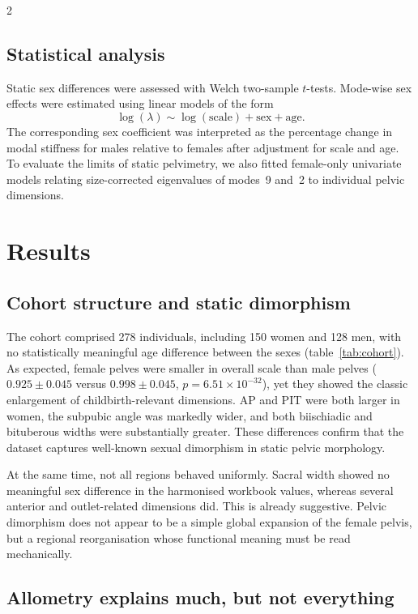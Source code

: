 \documentclass[openacc]{rsproca_new}
\begin{document}
\begin{multicols}{2}
\subsection{Statistical analysis}

Static sex differences were assessed with Welch two-sample $t$-tests. Mode-wise sex effects were estimated using linear models of the form
\begin{equation}
\log(\lambda) \sim \log(\mathrm{scale}) + \mathrm{sex} + \mathrm{age}.
\end{equation}
The corresponding sex coefficient was interpreted as the percentage change in modal stiffness for males relative to females after adjustment for scale and age. To evaluate the limits of static pelvimetry, we also fitted female-only univariate models relating size-corrected eigenvalues of modes~9 and~2 to individual pelvic dimensions.

\section{Results}


\subsection{Cohort structure and static dimorphism}

The cohort comprised 278 individuals, including 150 women and 128 men, with no statistically meaningful age difference between the sexes (table~\ref{tab:cohort}). As expected, female pelves were smaller in overall scale than male pelves ($0.925 \pm 0.045$ versus $0.998 \pm 0.045$, $p=6.51 \times 10^{-32}$), yet they showed the classic enlargement of childbirth-relevant dimensions. AP and PIT were both larger in women, the subpubic angle was markedly wider, and both biischiadic and bituberous widths were substantially greater. These differences confirm that the dataset captures well-known sexual dimorphism in static pelvic morphology.

At the same time, not all regions behaved uniformly. Sacral width showed no meaningful sex difference in the harmonised workbook values, whereas several anterior and outlet-related dimensions did. This is already suggestive. Pelvic dimorphism does not appear to be a simple global expansion of the female pelvis, but a regional reorganisation whose functional meaning must be read mechanically.

\subsection{Allometry explains much, but not everything}


\end{multicols}
\end{document}
